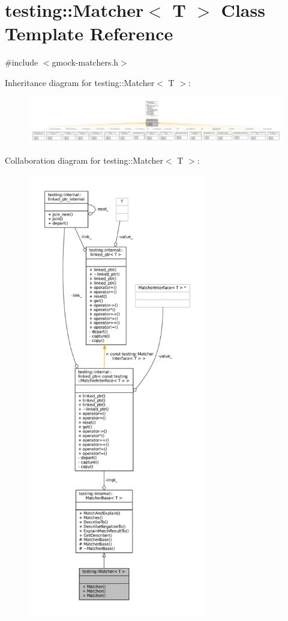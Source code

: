 \hypertarget{classtesting_1_1Matcher}{}\section{testing\+:\+:Matcher$<$ T $>$ Class Template Reference}
\label{classtesting_1_1Matcher}


{\ttfamily \#include $<$gmock-\/matchers.\+h$>$}



Inheritance diagram for testing\+:\+:Matcher$<$ T $>$\+:
\nopagebreak
\begin{figure}[H]
\begin{center}
\leavevmode
\includegraphics[width=350pt]{classtesting_1_1Matcher__inherit__graph}
\end{center}
\end{figure}


Collaboration diagram for testing\+:\+:Matcher$<$ T $>$\+:
\nopagebreak
\begin{figure}[H]
\begin{center}
\leavevmode
\includegraphics[height=550pt]{classtesting_1_1Matcher__coll__graph}
\end{center}
\end{figure}
